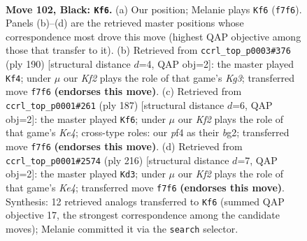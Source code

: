 \documentclass[11pt]{article}
\begin{document}
\clearpage

\begin{figure}[p]\centering
\begin{subfigure}{0.46\textwidth}\centering
\resizebox{\linewidth}{!}{%
\newchessgame
\chessboard[
  setfen={7K/5k2/8/5p2/5P2/8/2b5/8 b - - 19 102},
  showmover=false,
  pgfstyle=straightmove, color=movearrow, markmove={f7-f6}
]}
\caption{}
\end{subfigure}\hfill
\begin{subfigure}{0.46\textwidth}\centering
\resizebox{\linewidth}{!}{%
\newchessgame
\chessboard[
  setfen={7k/8/6P1/8/8/3B2K1/8/8 w - - 1 96},
  showmover=false,
  pgfstyle=straightmove, color=movearrow, markmove={g3-f4}
]}
\caption{}
\end{subfigure}
\\[4pt]
\begin{subfigure}{0.46\textwidth}\centering
\resizebox{\linewidth}{!}{%
\newchessgame
\chessboard[
  setfen={8/4b3/8/2p1k3/8/3K2p1/6B1/8 b - - 59 94},
  showmover=false,
  pgfstyle=straightmove, color=movearrow, markmove={e5-f6}
]}
\caption{}
\end{subfigure}\hfill
\begin{subfigure}{0.46\textwidth}\centering
\resizebox{\linewidth}{!}{%
\newchessgame
\chessboard[
  setfen={8/6Bp/4k2P/8/4K3/8/8/5r2 w - - 77 109},
  showmover=false,
  pgfstyle=straightmove, color=movearrow, markmove={e4-d3}
]}
\caption{}
\end{subfigure}
\caption{\textbf{Move 102, Black: \texttt{Kf6}.} (a) Our position; Melanie plays \texttt{Kf6} (\texttt{f7f6}). Panels (b)--(d) are the retrieved master positions whose correspondence most drove this move (highest QAP objective among those that transfer to it). (b) Retrieved from \texttt{ccrl\_top\_p0003\#376} (ply 190) [structural distance $d$=4, QAP obj=2]: the master played \texttt{Kf4}; under $\mu$ our \emph{Kf2} plays the role of that game's \emph{Kg3}; transferred move \texttt{f7f6} \textbf{(endorses this move)}. (c) Retrieved from \texttt{ccrl\_top\_p0001\#261} (ply 187) [structural distance $d$=6, QAP obj=2]: the master played \texttt{Kf6}; under $\mu$ our \emph{Kf2} plays the role of that game's \emph{Ke4}; cross-type roles: our \emph{p}f4 as their \emph{b}g2; transferred move \texttt{f7f6} \textbf{(endorses this move)}. (d) Retrieved from \texttt{ccrl\_top\_p0001\#2574} (ply 216) [structural distance $d$=7, QAP obj=2]: the master played \texttt{Kd3}; under $\mu$ our \emph{Kf2} plays the role of that game's \emph{Ke4}; transferred move \texttt{f7f6} \textbf{(endorses this move)}. Synthesis: 12 retrieved analogs transferred to \texttt{Kf6} (summed QAP objective 17, the strongest correspondence among the candidate moves); Melanie committed it via the \texttt{search} selector.}
\label{fig:thought-m203}
\end{figure}
\end{document}
